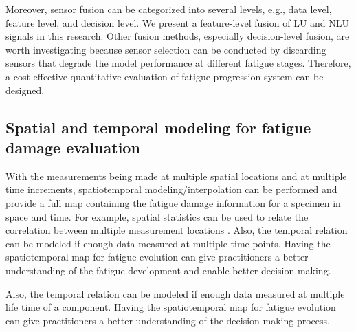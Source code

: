 Moreover, sensor fusion can be categorized into several levels, e.g., data level, feature level, and decision level. We present a feature-level fusion of LU and NLU signals in this research. Other fusion methods, especially decision-level fusion, are worth investigating because sensor selection can be conducted by discarding sensors that degrade the model performance at different fatigue stages. Therefore, a cost-effective quantitative evaluation of fatigue progression system can be designed.

\subsection{Spatial and temporal modeling for fatigue damage evaluation}

With the measurements being made at multiple spatial locations and at multiple time increments, spatiotemporal modeling/interpolation can be performed and provide a full map containing the fatigue damage information for a specimen in space and time. For example, spatial statistics can be used to relate the correlation between multiple measurement locations \cite{dynamic-sampling-Shao,yuhang,CHEN2021306}. Also, the temporal relation can be modeled if enough data measured at multiple time points. Having the spatiotemporal map for fatigue evolution can give practitioners a better understanding of the fatigue development and enable better decision-making.

Also, the temporal relation can be modeled if enough data measured at multiple life time of a component. Having the spatiotemporal map for fatigue evolution can give practitioners a better understanding of the decision-making process.